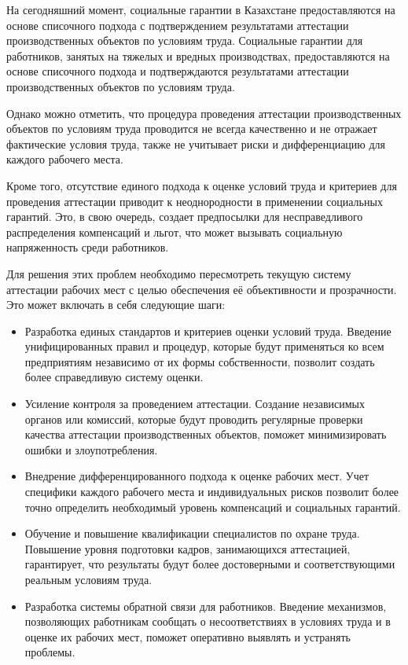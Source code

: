 \begin{multicols}{2}
На сегодняшний момент, социальные гарантии в Казахстане предоставляются
на основе списочного подхода с подтверждением результатами аттестации
производственных объектов по условиям труда. Социальные гарантии для
работников, занятых на тяжелых и вредных производствах, предоставляются
на основе списочного подхода и подтверждаются результатами аттестации
производственных объектов по условиям труда.

Однако можно отметить, что процедура проведения аттестации
производственных объектов по условиям труда проводится не всегда
качественно и не отражает фактические условия труда, также не учитывает
риски и дифференциацию для каждого рабочего места.

Кроме того, отсутствие единого подхода к оценке условий труда и
критериев для проведения аттестации приводит к неоднородности в
применении социальных гарантий. Это, в свою очередь, создает предпосылки
для несправедливого распределения компенсаций и льгот, что может
вызывать социальную напряженность среди работников.

Для решения этих проблем необходимо пересмотреть текущую систему
аттестации рабочих мест с целью обеспечения её объективности и
прозрачности. Это может включать в себя следующие шаги:

\begin{itemize}
\item
  Разработка единых стандартов и критериев оценки условий труда.
  Введение унифицированных правил и процедур, которые будут применяться
  ко всем предприятиям независимо от их формы собственности, позволит
  создать более справедливую систему оценки.
\item
  Усиление контроля за проведением аттестации. Создание независимых
  органов или комиссий, которые будут проводить регулярные проверки
  качества аттестации производственных объектов, поможет минимизировать
  ошибки и злоупотребления.
\item
  Внедрение дифференцированного подхода к оценке рабочих мест. Учет
  специфики каждого рабочего места и индивидуальных рисков позволит
  более точно определить необходимый уровень компенсаций и социальных
  гарантий.
\item
  Обучение и повышение квалификации специалистов по охране труда.
  Повышение уровня подготовки кадров, занимающихся аттестацией,
  гарантирует, что результаты будут более достоверными и
  соответствующими реальным условиям труда.
\item
  Разработка системы обратной связи для работников. Введение механизмов,
  позволяющих работникам сообщать о несоответствиях в условиях труда и в
  оценке их рабочих мест, поможет оперативно выявлять и устранять
  проблемы.
\end{itemize}


\end{multicols}
